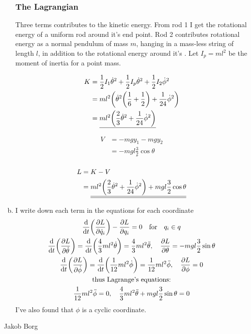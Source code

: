 \documentclass[11pt,a4paper]{report}
\newcounter{excount}[chapter]
\newenvironment{exercise}[1][]{\addtocounter{excount}{1} \noindent {\bf Problem
    \arabic{excount} \ \ #1}\hspace{2mm}}{\vspace{4mm}}
\newenvironment{solution}
    {\begin{tcolorbox}[title=Solution,halign lower=right,breakable]
    }
    {
    \tcblower Jakob Borg
    \end{tcolorbox}
	\vspace{5mm}
    }
\newcommand{\half}
{
\frac{1}{2}
}
\newcommand{\com}
{
\text{c.m.}
}
\begin{document}
\begin{exercise}
\begin{solution}
\begin{enumerate}[a)]
\subsubsection*{The Lagrangian}
Three terms contributes to the kinetic energy. From rod 1 I get the rotational energy of a uniform rod around it's end point. Rod 2 contributes rotational energy as a normal pendulum of mass $m$, hanging in a mass-less string of length $l$, in addition to the rotational energy around it's \com. Let $I_p = ml^2$ be the moment of inertia for a point mass.
\begin{multicols}{2}
\begin{align*}
	K &= \half I_1 \dot{\theta}^2 + \half I_p \dot{\theta}^2 + \half I_2 \dot{\phi}^2
	\\
	&= ml^2 \qty(\dot{\theta}^2\qty(\frac{1}{6} + \frac{1}{2}) + \frac{1}{24}\dot{\phi}^2)
	\\
	&=\underline{ ml^2\qty(\frac{2}{3}\dot{\theta}^2+ \frac{1}{24}\dot{\phi}^2)}
	\\
\end{align*}
\par
\begin{align*}
	V &= -mgy_1 - mgy_2
	\\
	&= \underline{-mgl\frac{3}{2}\cos \theta}
	\\
\end{align*}
\end{multicols}
\begin{align*}
	L &= K-V
	\\
	&= \underline{\underline{ml^2\qty(\frac{2}{3}\dot{\theta}^2+ \frac{1}{24}\dot{\phi}^2) + mgl\frac{3}{2}\cos \theta}}
\end{align*}

\item I write down each term in the equations for each coordinate
\begin{gather*}
	\dv{t} \qty( \pdv{L}{\dot{q}_i} ) - \pdv{L}{q_i} = 0 \qfor q_i \in q
	\\
	\dv{t} \qty( \pdv{L}{\dot{\theta}} ) = \dv{t} \qty( \frac{4}{3}ml^2\dot{\theta} ) = \frac{4}{3}ml^2\ddot{\theta}
	\qc \pdv{L}{\theta} = -mgl\frac{3}{2}\sin \theta
	\\
	\dv{t}\qty( \pdv{L}{\dot{\phi}} ) =\dv{t} \qty( \frac{1}{12}ml^2 \dot{\phi} ) =  \frac{1}{12}ml^2 \ddot{\phi} \qc	\pdv{L}{\phi} = 0
	\\
	\qq{thus Lagrange's equations:}
	\\
\frac{1}{12}ml^2 \ddot{\phi} = 0 \qc \frac{4}{3}ml^2\ddot{\theta} + mgl\frac{3}{2}\sin \theta = 0
\end{gather*}
I've also found that $\phi$ is a cyclic coordinate.


\end{enumerate}
\end{solution}
\end{exercise}
\end{document}
